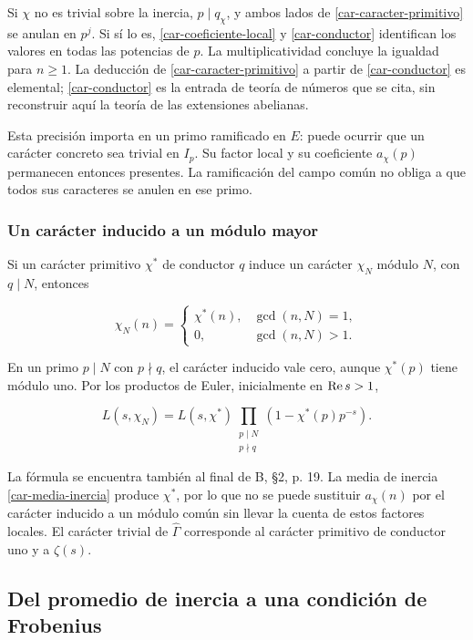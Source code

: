 Si $\chi$ no es trivial sobre la inercia, $p\mid q_\chi$, y ambos lados de \eqref{car-caracter-primitivo} se anulan en $p^j$. Si sí lo es, \eqref{car-coeficiente-local} y \eqref{car-conductor} identifican los valores en todas las potencias de $p$. La multiplicatividad concluye la igualdad para $n\ge1$. La deducción de \eqref{car-caracter-primitivo} a partir de \eqref{car-conductor} es elemental; \eqref{car-conductor} es la entrada de teoría de números que se cita, sin reconstruir aquí la teoría de las extensiones abelianas.

Esta precisión importa en un primo ramificado en $E$: puede ocurrir que un carácter concreto sea trivial en $I_p$. Su factor local y su coeficiente $a_\chi(p)$ permanecen entonces presentes. La ramificación del campo común no obliga a que todos sus caracteres se anulen en ese primo.

\subsubsection*{Un carácter inducido a un módulo mayor}

Si un carácter primitivo $\chi^*$ de conductor $q$ induce un carácter $\chi_N$ módulo $N$, con $q\mid N$, entonces

\[
\chi_N(n)=
\begin{cases}
\chi^*(n),&\gcd(n,N)=1,\\
0,&\gcd(n,N)>1.
\end{cases}
\]

En un primo $p\mid N$ con $p\nmid q$, el carácter inducido vale cero, aunque $\chi^*(p)$ tiene módulo uno. Por los productos de Euler, inicialmente en $\operatorname{Re} s>1$,

\begin{equation}
L(s,\chi_N)
=L(s,\chi^*)
\prod_{\substack{p\mid N\\p\nmid q}}
(1-\chi^*(p)p^{-s}).
\label{car-euler-inducido}
\end{equation}

La fórmula se encuentra también al final de B, §2, p. 19. La media de inercia \eqref{car-media-inercia} produce $\chi^*$, por lo que no se puede sustituir $a_\chi(n)$ por el carácter inducido a un módulo común sin llevar la cuenta de estos factores locales. El carácter trivial de $\widehat\Gamma$ corresponde al carácter primitivo de conductor uno y a $\zeta(s)$.

\subsection{Del promedio de inercia a una condición de Frobenius}


